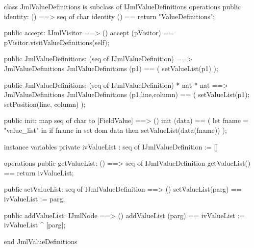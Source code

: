 \begin{vdm_al}
class JmlValueDefinitions is subclass of IJmlValueDefinitions
operations
  public identity: () ==> seq of char
  identity () == return "ValueDefinitions";

  public accept: IJmlVisitor ==> ()
  accept (pVisitor) == pVisitor.visitValueDefinitions(self);

  public JmlValueDefinitions:
    (seq of IJmlValueDefinition) ==> JmlValueDefinitions
  JmlValueDefinitions (p1) == 
    ( setValueList(p1) );

  public JmlValueDefinitions:
    (seq of IJmlValueDefinition) *
    nat *
    nat ==> JmlValueDefinitions
  JmlValueDefinitions (p1,line,column) == 
    ( setValueList(p1);
      setPosition(line, column) );

  public init: map seq of char to [FieldValue] ==> ()
  init (data) ==
    ( let fname = "value_list" in
        if fname in set dom data
        then setValueList(data(fname)) );

instance variables
  private ivValueList : seq of IJmlValueDefinition := []

operations
  public getValueList: () ==> seq of IJmlValueDefinition
  getValueList() == return ivValueList;

  public setValueList: seq of IJmlValueDefinition ==> ()
  setValueList(parg) == ivValueList := parg;

  public addValueList: IJmlNode ==> ()
  addValueList (parg) == ivValueList := ivValueList ^ [parg];

end JmlValueDefinitions
\end{vdm_al}

